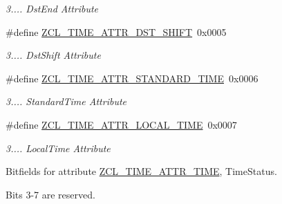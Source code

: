 \begin{DoxyCompactItemize}
\begin{DoxyCompactList}\small\item\em 3.... Dst\+End Attribute \end{DoxyCompactList}\item 
\mbox{\label{group__zcl__time_ga62da9f7b4065ce9e96b0f818a4b9bb5c}} 
\#define \hyperlink{group__zcl__time_ga62da9f7b4065ce9e96b0f818a4b9bb5c}{Z\+C\+L\+\_\+\+T\+I\+M\+E\+\_\+\+A\+T\+T\+R\+\_\+\+D\+S\+T\+\_\+\+S\+H\+I\+FT}~0x0005
\begin{DoxyCompactList}\small\item\em 3.... Dst\+Shift Attribute \end{DoxyCompactList}\item 
\mbox{\label{group__zcl__time_gac2ab06404c97ad9c24f6e53297966d06}} 
\#define \hyperlink{group__zcl__time_gac2ab06404c97ad9c24f6e53297966d06}{Z\+C\+L\+\_\+\+T\+I\+M\+E\+\_\+\+A\+T\+T\+R\+\_\+\+S\+T\+A\+N\+D\+A\+R\+D\+\_\+\+T\+I\+ME}~0x0006
\begin{DoxyCompactList}\small\item\em 3.... Standard\+Time Attribute \end{DoxyCompactList}\item 
\mbox{\label{group__zcl__time_gad734cb8827c2307184fd74f1f1336c4f}} 
\#define \hyperlink{group__zcl__time_gad734cb8827c2307184fd74f1f1336c4f}{Z\+C\+L\+\_\+\+T\+I\+M\+E\+\_\+\+A\+T\+T\+R\+\_\+\+L\+O\+C\+A\+L\+\_\+\+T\+I\+ME}~0x0007
\begin{DoxyCompactList}\small\item\em 3.... Local\+Time Attribute \end{DoxyCompactList}\end{DoxyCompactItemize}
\label{_amgrp01747264fe7bf50731df0522c351974e}%
Bitfields for attribute \hyperlink{group__zcl__time_ga6abf0e2cc70ac533ebe153a40185be63}{Z\+C\+L\+\_\+\+T\+I\+M\+E\+\_\+\+A\+T\+T\+R\+\_\+\+T\+I\+ME}, Time\+Status.

Bits 3-\/7 are reserved.

